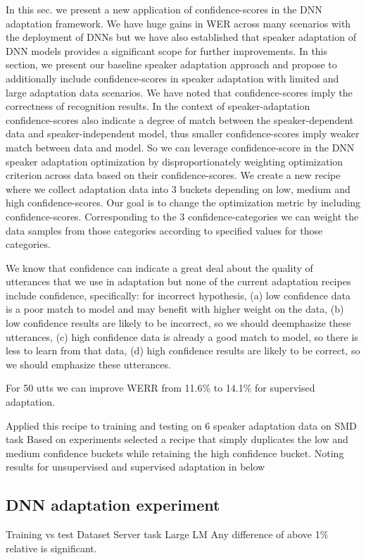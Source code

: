 In this sec. we present a new application of confidence-scores in the DNN adaptation framework. We have huge gains in WER across many scenarios with the deployment of DNNs but we have also established that speaker adaptation of DNN models provides a significant scope for further improvements. In this section, we present our baseline speaker adaptation approach and propose to additionally include confidence-scores in speaker adaptation with limited and large adaptation data scenarios. We have noted that confidence-scores imply the correctness of recognition results. In the context of speaker-adaptation confidence-scores also indicate a degree of match between the speaker-dependent data and speaker-independent model, thus smaller confidence-scores imply weaker match between data and model. So we can leverage confidence-score in the DNN speaker adaptation optimization by disproportionately weighting optimization criterion across data based on their confidence-scores. We create a new recipe where we collect adaptation data into 3 buckets depending on low, medium and high confidence-scores. Our goal is to change the optimization metric by including confidence-scores. Corresponding to the 3 confidence-categories we can weight the data samples from those categories according to specified values for those categories.

We know that confidence can indicate a great deal about the quality of utterances that we use in adaptation but none of the current adaptation recipes include confidence, specifically: for incorrect hypothesis, (a) low confidence data is a poor match to model and may benefit with higher weight on the data, (b) low confidence results are likely to be incorrect, so we should deemphasize these utterances, (c) high confidence data is already a good match to model, so there is less to learn from that data, (d) high confidence results are likely to be correct, so we should emphasize these utterances.

For 50 utts we can improve WERR from 11.6\% to 14.1\% for supervised adaptation.

Applied this recipe to training and testing on 6 speaker adaptation data on SMD task
Based on experiments selected a recipe that simply duplicates the low and medium confidence buckets while retaining the high confidence bucket. Noting results for unsupervised and supervised adaptation in below

\subsection{DNN adaptation experiment}
Training vs test Dataset
Server task
Large LM
Any difference of above 1\% relative is significant.



